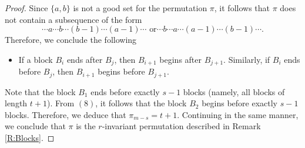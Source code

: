 \documentclass[10pt,a4paper]{amsart}
\begin{document}
\begin{proof}
Since $\{a,b\}$ is not a good set for the permutation $\pi$, it
follows that $\pi$ does not contain a subsequence of the form
$$\cdots a\cdots b\cdots (b-1) \cdots (a-1)\cdots \textrm{ or}
\cdots b\cdots a\cdots (a-1) \cdots (b-1)\cdots. $$ Therefore, we
conclude the following
\begin{itemize}
    \item[(8)] If a block $B_i$ ends after $B_j$, then $B_{i+1}$ begins
    after
    $B_{j+1}$. Similarly, if $B_i$ ends before $B_j$,
    then $B_{i+1}$ begins
before
    $B_{j+1}$.
\end{itemize}

Note that the block $B_1$ ends before exactly $s-1$ blocks
(namely, all blocks of length $t+1$). From $(8)$, it follows that
the block $B_2$ begins before exactly $s-1$ blocks. Therefore, we
deduce that $\pi_{m-s}=t+1$. Continuing in the same manner, we
conclude that $\pi$ is the $r$-invariant permutation described in
Remark \ref{R:Blocks}.

\end{proof}
\end{document}
